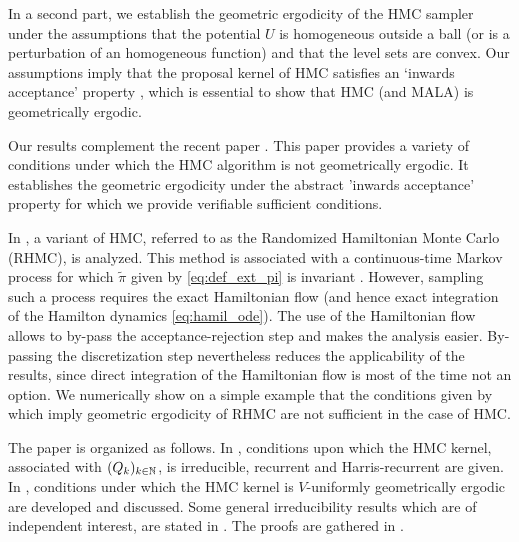 In a second part, we establish the geometric ergodicity of the HMC
sampler under the assumptions that the potential $U$ is homogeneous
outside a ball (or is a perturbation of an homogeneous function) and
that the level sets are convex.  Our assumptions
imply that the proposal kernel of HMC satisfies an ‘inwards
acceptance’ property \cite{roberts:tweedie:1996}, which is essential
to show that HMC (and MALA) is geometrically ergodic.

Our results complement the recent paper \cite{livingstone:betancourt:byrne:girolami:2016}. This paper provides a variety of conditions under which the HMC algorithm is not geometrically ergodic. It establishes the geometric ergodicity under the abstract 'inwards acceptance' property for which we provide verifiable sufficient conditions.

In \cite{bou:sanz:2017}, a variant of HMC, referred to as the
Randomized Hamiltonian Monte Carlo (RHMC), is analyzed. This method is
associated with a conti\-nuous-time Markov process for which
$\tilde{\pi}$ given by \eqref{eq:def_ext_pi} is invariant
\cite[Proposition 3.1]{bou:sanz:2017}.  However, sampling such a
process requires the exact Hamiltonian flow (and hence exact
integration of the Hamilton dynamics \eqref{eq:hamil_ode}). The use of
the Hamiltonian flow allows to by-pass the acceptance-rejection step
and makes the analysis easier.
By-passing the discretization step nevertheless reduces the
applicability of the results, since direct integration of the
Hamiltonian flow is most of the time not an option.
We numerically show on a simple example
that the conditions given by \cite{bou:sanz:2017} which imply
geometric ergodicity of RHMC are not sufficient in the case of HMC.

The paper is organized as follows. In , conditions upon which the
HMC kernel, associated with $(Q_k)_{k \in \mathbb{N}}$, is irreducible, recurrent and Harris-recurrent are given.
In , conditions under which the HMC kernel is $V$-uniformly geometrically ergodic  are developed and discussed. Some general irreducibility results which are of independent interest, are stated in . The proofs are gathered in
.





